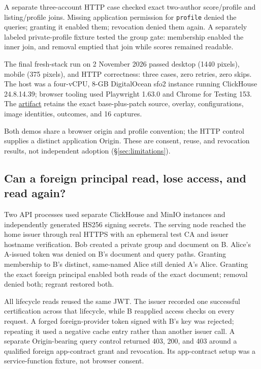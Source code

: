 \documentclass[sigconf, nonacm]{acmart}
\newcommand{\artifactbase}{https://github.com/jacoby149/web10}
\newcommand{\domainartifactrev}{26720acba859c7eb03fc5d26a6221cdde5b764a1}
\newcommand{\evidence}[2]{\href{\artifactbase/tree/\domainartifactrev/#1}{#2}}
\begin{document}
A separate three-account HTTP case checked exact two-author score/profile
and listing/profile joins. Missing application permission for
\texttt{profile} denied the queries; granting it enabled them; revocation
denied them again. A separately labeled private-profile fixture tested
the group gate: membership enabled the inner join, and removal emptied
that join while scores remained readable.

The final fresh-stack run on 2 November 2026 passed desktop (1440 pixels),
mobile (375 pixels), and HTTP correctness: three cases, zero retries,
zero skips. The host was a four-vCPU, 8-GB DigitalOcean sfo2 instance
running ClickHouse 24.8.14.39; browser tooling used Playwright 1.63.0 and
Chrome for Testing 153. The \evidence{research/interoperability-demo}{artifact}
retains the exact base-plus-patch source, overlay, configurations, image
identities, outcomes, and 16 captures.

Both demos share a browser origin and profile convention; the HTTP control
supplies a distinct application Origin. These are consent, reuse, and
revocation results, not independent adoption (\S\ref{sec:limitations}).

\subsection{Can a foreign principal read, lose access, and read again?}
\label{sec:ev-network}

Two API processes used separate ClickHouse and MinIO instances and
independently generated HS256 signing secrets. The serving node reached
the home issuer through real HTTPS with an ephemeral test CA and issuer
hostname verification. Bob created a private group and document on B.
Alice's A-issued token was denied on B's document and query paths.
Granting membership to B's distinct, same-named Alice still denied
A's Alice. Granting the exact foreign principal enabled both reads of
the exact document; removal denied both; regrant restored both.

All lifecycle reads reused the same JWT. The issuer recorded one
successful certification across that lifecycle, while B reapplied access
checks on every request. A forged foreign-provider token signed with
B's key was rejected; repeating it used a negative cache entry rather
than another issuer call. A separate Origin-bearing query control
returned 403, 200, and 403 around a qualified foreign app-contract grant
and revocation. Its app-contract setup was a service-function fixture,
not browser consent.
\end{document}
